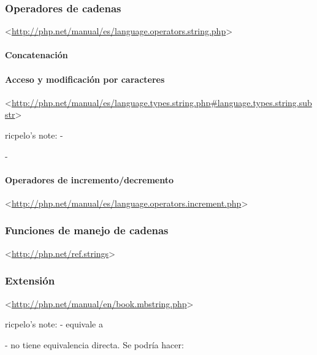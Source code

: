\documentclass[a4paper,11pt,spanish]{sphinxmanual}
\begin{document}
\subsubsection{Operadores de cadenas}
\label{\detokenize{php:operadores-de-cadenas}}
\textless{}\url{http://php.net/manual/es/language.operators.string.php}\textgreater{}


\paragraph{Concatenación}
\label{\detokenize{php:concatenacion}}

\paragraph{Acceso y modificación por caracteres}
\label{\detokenize{php:acceso-y-modificacion-por-caracteres}}
\textless{}\url{http://php.net/manual/es/language.types.string.php\#language.types.string.substr}\textgreater{}

\begin{DUlineblock}{0em}
\item[] ricpelo's note: - 
\item[] - 
\end{DUlineblock}


\paragraph{Operadores de incremento/decremento}
\label{\detokenize{php:id1}}
\textless{}\url{http://php.net/manual/es/language.operators.increment.php}\textgreater{}


\subsubsection{Funciones de manejo de cadenas}
\label{\detokenize{php:funciones-de-manejo-de-cadenas}}
\textless{}\url{http://php.net/ref.strings}\textgreater{}


\subsubsection{Extensión }
\label{\detokenize{php:extension-mbstring}}
\textless{}\url{http://php.net/manual/en/book.mbstring.php}\textgreater{}

\begin{DUlineblock}{0em}
\item[] ricpelo's note: -  equivale a 
\item[] -  no tiene equivalencia directa. Se podría hacer:
\item[] 
\end{DUlineblock}
\end{document}
